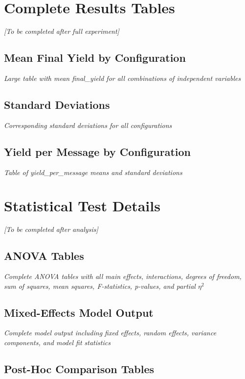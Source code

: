 \section{Complete Results Tables}

\textit{[To be completed after full experiment]}

\subsection{Mean Final Yield by Configuration}

\textit{Large table with mean final\_yield for all combinations of independent variables}

\subsection{Standard Deviations}

\textit{Corresponding standard deviations for all configurations}

\subsection{Yield per Message by Configuration}

\textit{Table of yield\_per\_message means and standard deviations}

\section{Statistical Test Details}

\textit{[To be completed after analysis]}

\subsection{ANOVA Tables}

\textit{Complete ANOVA tables with all main effects, interactions, degrees of freedom, sum of squares, mean squares, F-statistics, p-values, and partial $\eta^2$}

\subsection{Mixed-Effects Model Output}

\textit{Complete model output including fixed effects, random effects, variance components, and model fit statistics}

\subsection{Post-Hoc Comparison Tables}


